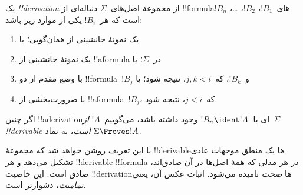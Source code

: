 \documentclass[../../../include/open-logic-section]{subfiles}
\begin{document}
\begin{defn}
یک \emph{!!{derivation}} از مجموعهٔ اصل‌های~$\Sigma$ دنباله‌ای از
!!{formula}های~$!B_1$، $!B_2$، \dots، $!B_n$ است که هر~$!B_i$ یکی از
موارد زیر باشد:
\begin{enumerate}
\item یک نمونهٔ جانشینی از همان‌گویی؛ یا
\item یک نمونهٔ جانشینی از !!a{formula} در~$\Sigma$؛ یا
\item با وضع مقدم از دو !!{formula}~$!B_j$ و~$!B_k$، که~$j,k<i$،
  نتیجه شود؛ یا
\item با ضرورت‌بخشی از !!a{formula}~$!B_j$، که~$j<i$، نتیجه شود.
\end{enumerate}
اگر چنین !!a{derivation}ای با~$!B_n \ident !A$ وجود داشته باشد،
می‌گوییم~$!A$ \emph{از~$\Sigma$ !!{derivable} است}، به نماد
$\Sigma \Proves !A$.
\end{defn}

با این تعریف روشن خواهد شد که مجموعهٔ !!{derivable}ها یک منطق
موجهات عادی تشکیل می‌دهد و هر !!{derivable} !!{formula} در هر مدلی که
همهٔ اصل‌ها در آن صادق‌اند، صادق است. این خاصیت !!{derivation}ها
\emph{صحت} نامیده می‌شود. اثبات عکس آن، یعنی \emph{تمامیت}، دشوارتر است.
\end{document}
